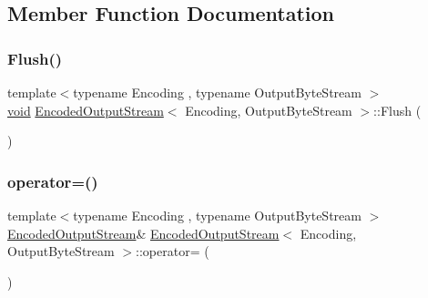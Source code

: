 \subsection{Member Function Documentation}
\mbox{\label{classEncodedOutputStream_a657188f6a9f0fae01a4012c288d3fd46}} 
\subsubsection{\texorpdfstring{Flush()}{Flush()}}
{\footnotesize\ttfamily template$<$typename Encoding , typename Output\+Byte\+Stream $>$ \\
\hyperlink{imgui__impl__opengl3__loader_8h_ac668e7cffd9e2e9cfee428b9b2f34fa7}{void} \hyperlink{classEncodedOutputStream}{Encoded\+Output\+Stream}$<$ Encoding, Output\+Byte\+Stream $>$\+::Flush (\begin{DoxyParamCaption}{ }\end{DoxyParamCaption})\hspace{0.3cm}{\ttfamily [inline]}}

\mbox{\label{classEncodedOutputStream_aea0f29efebf92a500632f02f2d961a96}} 
\subsubsection{\texorpdfstring{operator=()}{operator=()}}
{\footnotesize\ttfamily template$<$typename Encoding , typename Output\+Byte\+Stream $>$ \\
\hyperlink{classEncodedOutputStream}{Encoded\+Output\+Stream}\& \hyperlink{classEncodedOutputStream}{Encoded\+Output\+Stream}$<$ Encoding, Output\+Byte\+Stream $>$\+::operator= (\begin{DoxyParamCaption}\item[{const \hyperlink{classEncodedOutputStream}{Encoded\+Output\+Stream}$<$ Encoding, Output\+Byte\+Stream $>$ \&}]{ }\end{DoxyParamCaption})\hspace{0.3cm}{\ttfamily [private]}}

\mbox{\label{classEncodedOutputStream_a22e00087e16ad7a12438fb34fb562bb7}} 
